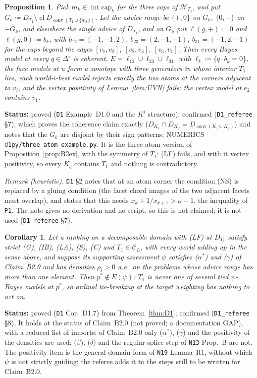 \documentclass[11pt]{article}
\newtheorem{proposition}[theorem]{Proposition}
\newtheorem{corollary}[theorem]{Corollary}
\theoremstyle{definition}
\theoremstyle{remark}
\newcommand{\Di}{\Delta^{\circ}}
\newcommand{\C}{\mathcal C}
\newcommand{\cl}{\operatorname{cl}}
\newcommand{\co}{\operatorname{conv}}
\newcommand{\src}[1]{\texttt{#1}}
\newcommand{\status}[1]{\par\smallskip\noindent\textbf{Status:} #1\par\smallskip}
\begin{document}
\begin{proposition}\label{prop:D10}
Pick $m_k\in\operatorname{int}\mathrm{cap}_k$ for the three caps of $\mathcal H_{T_1}$, and put $G_k\coloneqq D_{T_1}\setminus\cl D_{\co(T_1\cup\{m_k\})}$. Let the advice range be $\{+,0\}$ on $G_k$, $\{0,-\}$ on $-G_k$, and elsewhere the single advice of $D_{T_1}$, and on $G_k$ put $\ell(g,+)\coloneqq0$ and $\ell(g,0)\coloneqq b_k$, with $b_{12}=(-1,-1,2)$, $b_{23}=(2,-1,-1)$, $b_{31}=(-1,2,-1)$ for the caps beyond the edges $[v_1,v_2]$, $[v_2,v_3]$, $[v_3,v_1]$. Then every Bayes model at every $q\in\Di$ is coherent, $E=\ell_{12}\cup\ell_{23}\cup\ell_{31}$ with $\ell_k\coloneqq\{q\cdot b_k=0\}$, the face models at $u$ form a zonotope with three generators in whose interior $T_1$ lies, each world-$i$-best model rejects exactly the two atoms at the corners adjacent to $v_i$, and the vertex positivity of Lemma~\ref{lem:UVN} fails: the vertex model at $e_2$ contains $v_1$.
\end{proposition}
\status{proved (\src{D1} Example~D1.0 and the $K^i$ structure); confirmed (\src{D1\_referee} \S7), which proves the coherence claim exactly ($D_{K_1}\cap D_{K_2}=D_{\co(K_1\cup K_2)}$) and notes that the $G_k$ are disjoint by their sign patterns; NUMERICS \src{d1py/three\_atom\_example.py}. It is the three-atom version of Proposition~\ref{prop:B2ex}, with the symmetry of $T_1$: (LF) fails, and with it vertex positivity, so every $K_q$ contains $T_1$ and nothing is contradictory.}

\emph{Remark (heuristic).} \src{D1} \S2 notes that at an atom corner the condition (NS) is replaced by a gluing condition (the facet chord images of the two adjacent facets must overlap), and states that this needs $x_k+1/x_{k+1}>\kappa+1$, the inequality of \src{P1}. The note gives no derivation and no script, so this is not claimed; it is not used (\src{D1\_referee} \S7).

\begin{corollary}\label{cor:D17}
Let a ranking on a decomposable domain with (LF) at $D_{T_1}$ satisfy strict (G), (IB), (LA), (S), (C) and $T_1\in\C_L$, with every world adding up in the sense above, and suppose its supporting assessment $\psi$ satisfies ($\alpha^*$) and ($\gamma$) of Claim~B2.0 and has densities $\rho_i>0$ a.e.\ on the problems whose advice range has more than one element. Then $p^*\notin E(\psi)$: $T_1$ is never one of several tied $\psi$-Bayes models at $p^*$, so ordinal tie-breaking at the target weighting has nothing to act on.
\end{corollary}
\status{proved (\src{D1} Cor.~D1.7) from Theorem~\ref{thm:D1}; confirmed (\src{D1\_referee} \S8). It holds at the status of Claim~B2.0 (not proved; a documentation GAP), with a reduced list of imports: of Claim~B2.0 only ($\alpha^*$), ($\gamma$) and the positivity of the densities are used; ($\beta$), ($\delta$) and the regular-splice step of \src{N13} Prop.~B are not. The positivity item is the general-domain form of \src{N19} Lemma~R1, without which $\psi$ is not strictly guiding; the referee adds it to the steps still to be written for Claim~B2.0.}
\end{document}
